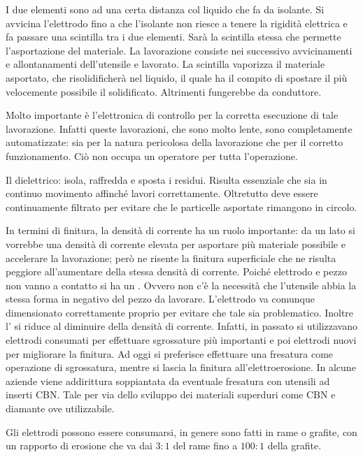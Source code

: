 I due elementi sono ad una certa distanza col liquido che fa da isolante. Si avvicina l'elettrodo fino a che l'isolante non riesce a tenere la rigidità elettrica e fa passare una scintilla tra i due elementi.
Sarà la scintilla stessa che permette l'asportazione del materiale.
La lavorazione consiste nei successivo avvicinamenti e allontanamenti dell'utensile e lavorato.
La scintilla vaporizza il materiale asportato, che risolidificherà nel liquido, il quale ha il compito di spostare il più velocemente possibile il solidificato. Altrimenti fungerebbe da conduttore.

Molto importante è l'elettronica di controllo per la corretta esecuzione di tale lavorazione. Infatti queste lavorazioni, che sono molto lente, sono completamente automatizzate: sia per la natura pericolosa della lavorazione che per il corretto funzionamento. Ciò non occupa un operatore per tutta l'operazione.

Il dielettrico: isola, raffredda e sposta i residui. Risulta essenziale che sia in continuo movimento affinché lavori correttamente. Oltretutto deve essere continuamente filtrato per evitare che le particelle asportate rimangono in circolo. 

In termini di finitura, la densità di corrente ha un ruolo importante: da un lato si vorrebbe una densità di corrente elevata per asportare più materiale possibile e accelerare la lavorazione; però ne risente la finitura superficiale che ne risulta peggiore all'aumentare della stessa densità di corrente.
Poiché elettrodo e pezzo non vanno a contatto si ha un . Ovvero non c'è la necessità che l'utensile abbia la stessa forma in negativo del pezzo da lavorare. L'elettrodo va comunque dimensionato correttamente proprio per evitare che tale  sia problematico.
Inoltre l' si riduce al diminuire della densità di corrente.
Infatti, in passato si utilizzavano elettrodi consumati per effettuare sgrossature più importanti e poi elettrodi nuovi per migliorare la finitura.
Ad oggi si preferisce effettuare una fresatura come operazione di sgrossatura, mentre si lascia la finitura all'elettroerosione.
In alcune aziende viene addirittura soppiantata da eventuale fresatura con utensili ad inserti CBN. Tale per via dello sviluppo dei materiali superduri come CBN e diamante ove utilizzabile.

Gli elettrodi possono essere consumarsi, in genere sono fatti in rame o grafite, con un rapporto di erosione che va dai $3:1$ del rame fino a $100:1$ della grafite.

